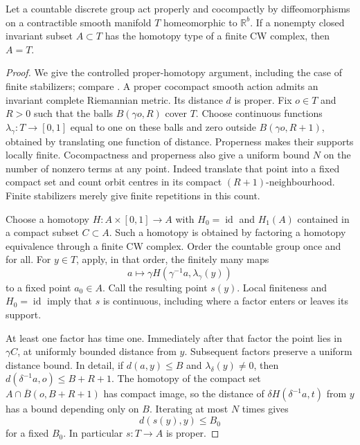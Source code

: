 \begin{lemma}
\label{cmp:closed-rigidity}
Let a countable discrete group act properly and cocompactly by
diffeomorphisms on a contractible smooth manifold $T$ homeomorphic to
$\mathbb R^b$.  If a nonempty closed invariant subset $A\subset T$
has the homotopy type of a finite CW complex, then $A=T$.
\end{lemma}

\begin{proof}
We give the controlled proper-homotopy argument, including the case
of finite stabilizers; compare \cite[\S1, Lemmas~11--12 and
Proposition~13]{KollarPardon2012}.  A proper cocompact smooth action
admits an invariant complete Riemannian metric.  Its distance $d$ is
proper.  Fix $o\in T$ and $R>0$ such that the balls $B(\gamma o,R)$
cover $T$.  Choose continuous functions $\lambda_\gamma:T\to[0,1]$
equal to one on these balls and zero outside $B(\gamma o,R+1)$,
obtained by translating one function of distance.  Properness makes
their supports locally finite.  Cocompactness and properness also
give a uniform bound $N$ on the number of nonzero terms at any point.
Indeed translate that point into a fixed compact set and count orbit
centres in its compact $(R+1)$-neighbourhood.  Finite stabilizers
merely give finite repetitions in this count.

Choose a homotopy $H:A\times[0,1]\to A$ with $H_0=\operatorname{id}$
and $H_1(A)$ contained in a compact subset $C\subset A$.  Such a
homotopy is obtained by factoring a homotopy equivalence through a
finite CW complex.  Order the countable group once and for all.
For $y\in T$, apply, in that order, the finitely many maps
\[
       a\longmapsto\gamma H(\gamma^{-1}a,\lambda_\gamma(y))
\]
to a fixed point $a_0\in A$.  Call the resulting point $s(y)$.
Local finiteness and $H_0=\operatorname{id}$ imply that $s$ is
continuous, including where a factor enters or leaves its support.

At least one factor has time one.  Immediately after that factor the
point lies in $\gamma C$, at uniformly bounded distance from $y$.
Subsequent factors preserve a uniform distance bound.  In detail,
if $d(a,y)\le B$ and $\lambda_\delta(y)\ne0$, then
$d(\delta^{-1}a,o)\le B+R+1$.  The homotopy of the compact set
$A\cap\overline B(o,B+R+1)$ has compact image, so the distance of
$\delta H(\delta^{-1}a,t)$ from $y$ has a bound depending only on
$B$.  Iterating at most $N$ times gives
\[
                        d(s(y),y)\le B_0
\]
for a fixed $B_0$.  In particular $s:T\to A$ is proper.


\end{proof}
